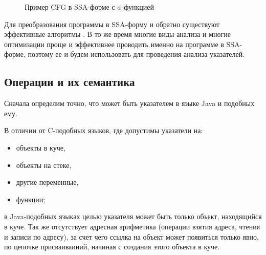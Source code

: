 \documentclass[14pt,titlepage]{extarticle}
\begin{document}
      \begin{figure}[!htb]
        \caption{Пример CFG в SSA-форме с $\phi$-функцией}
        \label{fig:cfg_with_phi}
      \end{figure}

      Для преобразования программы в SSA-форму и обратно существуют эффективные
      алгоритмы \cite{ssa}. В то же время
      многие виды анализа и многие оптимизации проще и эффективнее проводить
      именно на программе в SSA-форме, поэтому ее и
      будем использовать для проведения анализа указателей.

    \subsection{Операции и их семантика}
      \label{section:instructions}

      Сначала определим точно, что может быть указателем в языке Java и
      подобных ему.

      В отличии от C-подобных языков, где допустимы указатели на:
      \begin{itemize}
        \item объекты в куче,
        \item объекты на стеке,
        \item другие переменные,
        \item функции;
      \end{itemize}
      в Java-подобных языках целью
      указателя может быть только объект, находящийся в куче. Так же
      отсутствует адресная арифметика (операции взятия адреса,
      чтения и записи по адресу), за счет чего ссылка на объект может
      появиться только явно, по цепочке присваиваиний, начиная с создания этого
      объекта в куче.
\end{document}
